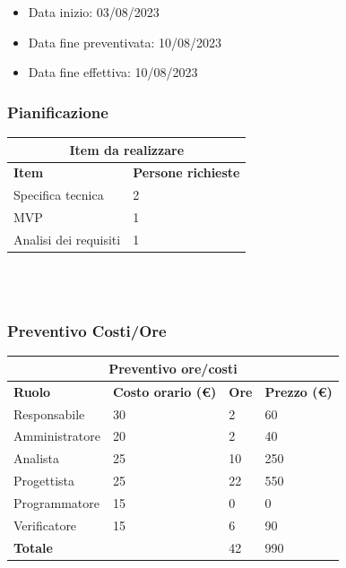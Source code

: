 \documentclass[9pt]{article}
\begin{document}
\begin{itemize}
	\item Data inizio: 03/08/2023
	\item Data fine preventivata: 10/08/2023
	\item Data fine effettiva: 10/08/2023
\end{itemize}
\subsubsection{Pianificazione}
\begin{center}
	\begin{tabularx}{\textwidth}{|X|X|}
		\hline
		\multicolumn{2}{|c|}{\textbf{Item da realizzare}}     \\
		\hline
		\hline
		\textbf{Item}            & \textbf{Persone richieste} \\
		\hline
		Specifica tecnica        	& 2                          \\
		\hline
		MVP        					& 1           \\
		\hline
		Analisi dei requisiti       & 1                          \\
		\hline
	\end{tabularx}\\[8pt]
	\mbox{}\\
\end{center}
\subsubsection{Preventivo Costi/Ore}
\begin{center}
	\begin{tabularx}{\textwidth}{|X|X|X|X|}
		\hline
		\multicolumn{4}{|c|}{\textbf{Preventivo ore/costi}}                                      \\
		\hline
		\hline
		\textbf{Ruolo}  & \textbf{Costo orario (\euro)} & \textbf{Ore} & \textbf{Prezzo (\euro)} \\
		\hline
		Responsabile    & 30                            & 2            & 60                      \\
		\hline
		Amministratore  & 20                            & 2            & 40                      \\
		\hline
		Analista        & 25                            & 10            & 250                       \\
		\hline
		Progettista     & 25                            & 22	            & 550                      \\
		\hline
		Programmatore   & 15                            & 0           & 0                     \\
		\hline
		Verificatore    & 15                            & 6           & 90                      \\
		\hline
		\textbf{Totale} &                               & 42           & 990                     \\
		\hline
	\end{tabularx}\\[8pt]
	\mbox{}\\
\end{center}
\end{document}
